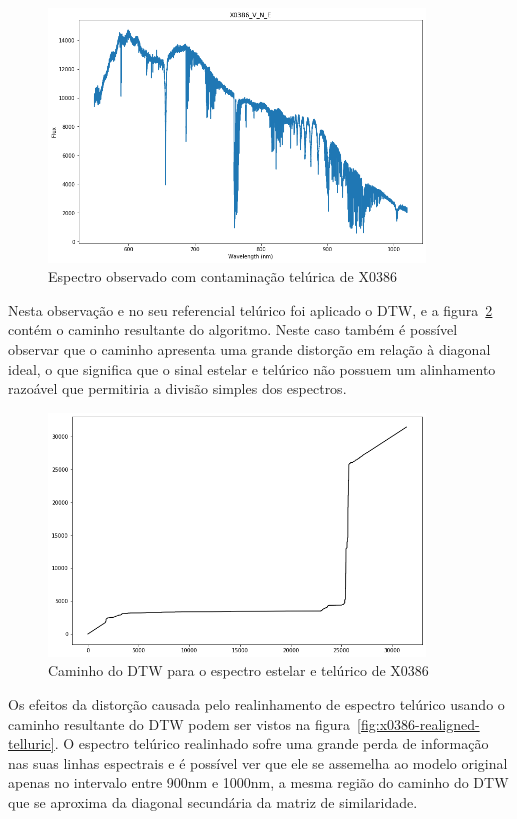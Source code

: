 \begin{figure}[htb]
\centering
\includegraphics[width=10cm]{figuras/x0386_v_n_e_spectrum.png}
\caption{Espectro observado com contaminação telúrica de X0386}
\label{fig:x0386-v-n-e}
\end{figure}

Nesta observação e no seu referencial telúrico foi aplicado o DTW, e a figura~\ref{fig:x0386-warp-path} contém o caminho resultante do algoritmo. Neste caso também é possível observar que o caminho apresenta uma grande distorção em relação à diagonal ideal, o que significa que o sinal estelar e telúrico não possuem um alinhamento razoável que permitiria a divisão simples dos espectros.

\begin{figure}[htb]
\centering
\includegraphics[width=10cm]{figuras/x0386_warp_path.png}
\caption{Caminho do DTW para o espectro estelar e telúrico de X0386}
\label{fig:x0386-warp-path}
\end{figure}

Os efeitos da distorção causada pelo realinhamento de espectro telúrico usando o caminho resultante do DTW podem ser vistos na figura~\ref{fig:x0386-realigned-telluric}. O espectro telúrico realinhado sofre uma grande perda de informação nas suas linhas espectrais e é possível ver que ele se assemelha ao modelo original apenas no intervalo entre 900nm e 1000nm, a mesma região do caminho do DTW que se aproxima da diagonal secundária da matriz de similaridade.

